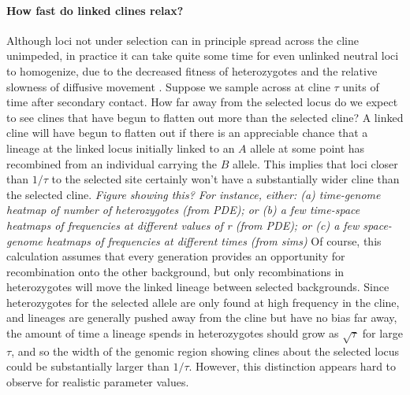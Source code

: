 \documentclass[12pt]{article}
\newcommand{\plr}[1]{{\em \color{blue} #1}}
\begin{document}
\paragraph{How fast do linked clines relax?}
Although loci not under selection can in principle spread across the cline unimpeded,
in practice it can take quite some time for even unlinked neutral loci to homogenize,
due to the decreased fitness of heterozygotes \citep{bartonbarrier}
and the relative slowness of diffusive movement \citep{Sedghifar2015}.
Suppose we sample across at cline $\tau$ units of time after secondary contact.
How far away from the selected locus do we expect to see clines that have begun to flatten out more
than the selected cline?
A linked cline will have begun to flatten out if there is an appreciable chance that
a lineage at the linked locus initially linked to an $A$ allele 
at some point has recombined from an individual carrying the $B$ allele.
This implies that loci closer than $1/\tau$ to the selected site
certainly won't have a substantially wider cline than the selected cline.
\plr{Figure showing this? 
    For instance, either: (a) time-genome heatmap of number of heterozygotes (from PDE);
    or (b) a few time-space heatmaps of frequencies at different values of r (from PDE);
    or (c) a few space-genome heatmaps of frequencies at different times (from sims)
}
Of course, this calculation assumes that every generation provides an opportunity for recombination 
onto the other background,
but only recombinations in heterozygotes will move the linked lineage between selected backgrounds.
Since heterozygotes for the selected allele are only found at high frequency in the cline,
and lineages are generally pushed away from the cline but have no bias far away,
the amount of time a lineage spends in heterozygotes should grow as $\sqrt{\tau}$ for large $\tau$,
and so the width of the genomic region showing clines about the selected locus could be 
substantially larger than $1/\tau$.
However, this distinction appears hard to observe for realistic parameter values.
\end{document}
